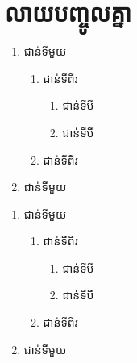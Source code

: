 \documentclass[serif]{beamer}
\begin{document}
    \section{លាយបញ្ចូលគ្នា}
    \begin{frame}
        \begin{theorem}
            \begin{enumerate}[A]
            \item ជាន់ទីមួយ
            \begin{enumerate}[1]
                \item ជាន់ទីពីរ
                \begin{enumerate}[i]
                    \item ជាន់ទីបី
                    \item ជាន់ទីបី
                \end{enumerate}
                \item ជាន់ទីពីរ
            \end{enumerate}
            \item ជាន់ទីមួយ
        \end{enumerate}
        \end{theorem}
    \end{frame}
    \begin{frame}
        \begin{example}
            \begin{enumerate}[<+-|alert@+>][I]
                \item ជាន់ទីមួយ
                \begin{enumerate}[1]
                    \item ជាន់ទីពីរ
                    \begin{enumerate}[a]
                        \item ជាន់ទីបី
                        \item ជាន់ទីបី
                    \end{enumerate}
                    \item ជាន់ទីពីរ
                \end{enumerate}
                \item ជាន់ទីមួយ
            \end{enumerate}
        \end{example}
    \end{frame}
\end{document}
